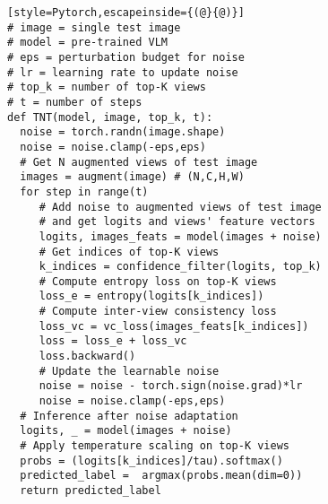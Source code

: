 \begin{algorithm}[t]
\caption{PyTorch style Pseudocode for TNT}
\label{alg:tnt}
\vspace{-1.ex}
\begin{lstlisting}[style=Pytorch,escapeinside={(@}{@)}]
# image = single test image 
# model = pre-trained VLM
# eps = perturbation budget for noise
# lr = learning rate to update noise
# top_k = number of top-K views
# t = number of steps
def TNT(model, image, top_k, t):
  noise = torch.randn(image.shape)
  noise = noise.clamp(-eps,eps)
  # Get N augmented views of test image
  images = augment(image) # (N,C,H,W)
  for step in range(t)
     # Add noise to augmented views of test image
     # and get logits and views' feature vectors
     logits, images_feats = model(images + noise)
     # Get indices of top-K views 
     k_indices = confidence_filter(logits, top_k)
     # Compute entropy loss on top-K views
     loss_e = entropy(logits[k_indices])
     # Compute inter-view consistency loss
     loss_vc = vc_loss(images_feats[k_indices]) 
     loss = loss_e + loss_vc
     loss.backward()
     # Update the learnable noise
     noise = noise - torch.sign(noise.grad)*lr
     noise = noise.clamp(-eps,eps)
  # Inference after noise adaptation
  logits, _ = model(images + noise)
  # Apply temperature scaling on top-K views
  probs = (logits[k_indices]/tau).softmax()
  predicted_label =  argmax(probs.mean(dim=0))
  return predicted_label
\end{lstlisting}
\vspace{-1.ex}
\end{algorithm}
